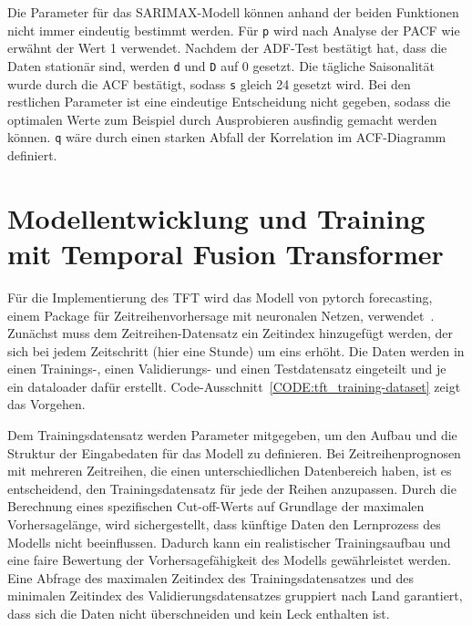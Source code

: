 Die Parameter für das SARIMAX-Modell können anhand der beiden Funktionen nicht immer eindeutig bestimmt werden.
Für \lstinline[columns=fixed]{p} wird nach Analyse der \ac{PACF} wie erwähnt der Wert 1 verwendet.
Nachdem der \ac{ADF}-Test bestätigt hat, dass die Daten stationär sind, werden \lstinline[columns=fixed]{d} und \lstinline[columns=fixed]{D} auf 0 gesetzt.
Die tägliche Saisonalität wurde durch die \ac{ACF} bestätigt, sodass \lstinline[columns=fixed]{s} gleich 24 gesetzt wird.
Bei den restlichen Parameter ist eine eindeutige Entscheidung nicht gegeben, sodass die optimalen Werte zum Beispiel durch Ausprobieren ausfindig gemacht werden können.
\lstinline[columns=fixed]{q} wäre durch einen starken Abfall der Korrelation im \ac{ACF}-Diagramm definiert.

\section{Modellentwicklung und Training mit Temporal Fusion Transformer}
Für die Implementierung des \ac{TFT} wird das Modell von \glqq pytorch forecasting\grqq{}, einem Package für Zeitreihenvorhersage mit neuronalen Netzen, verwendet~\cite{PytorchForecastingDocumentation.20230410T20:05:46.000Z}.
Zunächst muss dem Zeitreihen-Datensatz ein Zeitindex hinzugefügt werden, der sich bei jedem Zeitschritt (hier eine Stunde) um eins erhöht.
Die Daten werden in einen Trainings-, einen Validierungs- und einen Testdatensatz eingeteilt und je ein dataloader dafür erstellt.
Code-Ausschnitt~\ref{CODE:tft_training-dataset} zeigt das Vorgehen.

Dem Trainingsdatensatz werden Parameter mitgegeben, um den Aufbau und die Struktur der Eingabedaten für das Modell zu definieren.
Bei Zeitreihenprognosen mit mehreren Zeitreihen, die einen unterschiedlichen Datenbereich haben, ist es entscheidend, den Trainingsdatensatz für jede der Reihen anzupassen.
Durch die Berechnung eines spezifischen Cut-off-Werts auf Grundlage der maximalen Vorhersagelänge, wird sichergestellt, dass künftige Daten den Lernprozess des Modells nicht beeinflussen.
Dadurch kann ein realistischer Trainingsaufbau und eine faire Bewertung der Vorhersagefähigkeit des Modells gewährleistet werden.
Eine Abfrage des maximalen Zeitindex des Trainingsdatensatzes und des minimalen Zeitindex des Validierungsdatensatzes gruppiert nach Land garantiert, dass sich die Daten nicht überschneiden und kein Leck enthalten ist.

